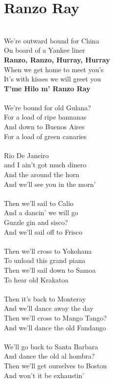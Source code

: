 \documentclass[letterpaper,14pt]{extarticle}
\begin{document}
\section{Ranzo Ray}
\noindent
\\We’re outward bound for China 
\\On board of a Yankee liner
\\\textbf{Ranzo, Ranzo, Hurray, Hurray}
\\When we get home to meet you’s
\\It’s with kisses we will greet you
\\\textbf{T’me Hilo m’ Ranzo Ray}
\\
\\We’re bound for old Gulana?
\\For a load of ripe bannanas
\\And down to Buenos Aires
\\For a load of green canaries
\\
\\Rio De Janeiro 
\\and I ain’t got much dinero
\\And the around the horn
\\And we’ll see you in the morn’
\\
\\Then we’ll sail to Calio
\\And a dancin’ we will go
\\Guzzle gin and sisco?
\\And we’ll sail off to Frisco
\\
\\Then we’ll cross to Yokohana
\\To unload this grand piana
\\Then we’ll sail down to Samoa
\\To hear old Krakatoa
\\
\\Then it’s back to Monteray
\\And we’ll dance away the day
\\Then we’ll cross to Mango Tango?
\\And we’ll dance the old Fandango
\\
\\We’ll go back to Santa Barbara
\\And dance the old al hombra?
\\Then we’ll get ourselves to Boston
\\And won’t it be exhaustin’
\end{document}
